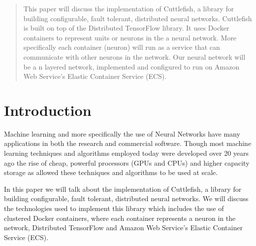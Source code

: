 \documentclass[conference]{IEEEtran}
\begin{document}




\maketitle

\begin{abstract}
This paper will discuss the implementation of Cuttlefish, a library for building configurable, fault tolerant, distributed neural networks. Cuttlefish is built on top of the Distributed TensorFlow library. It uses Docker containers to represent units or neurons in the a neural network. More specifically each container (neuron) will run as a service that can communicate with other neurons in the network. Our neural network will be a n layered network, implemented and configured to run on Amazon Web Service's Elastic Container Service (ECS).
\end{abstract}





%
\IEEEpeerreviewmaketitle



\section{Introduction}
Machine learning and more specifically the use of Neural Networks have many applications in both the research and commercial software. Though most machine learning techniques and algorithms employed today were developed over 20 years ago the rise of cheap, powerful processors (GPUs and CPUs) and higher capacity storage as allowed these techniques and algorithms to be used at scale.

In this paper we will talk about the implementation of Cuttlefish, a library for building configurable, fault tolerant, distributed neural networks. We will discuss the technologies used to implement this library which includes the use of clustered Docker containers, where each container represents a neuron in the network, Distributed TensorFlow and Amazon Web Service's Elastic Container Service (ECS).
\end{document}
